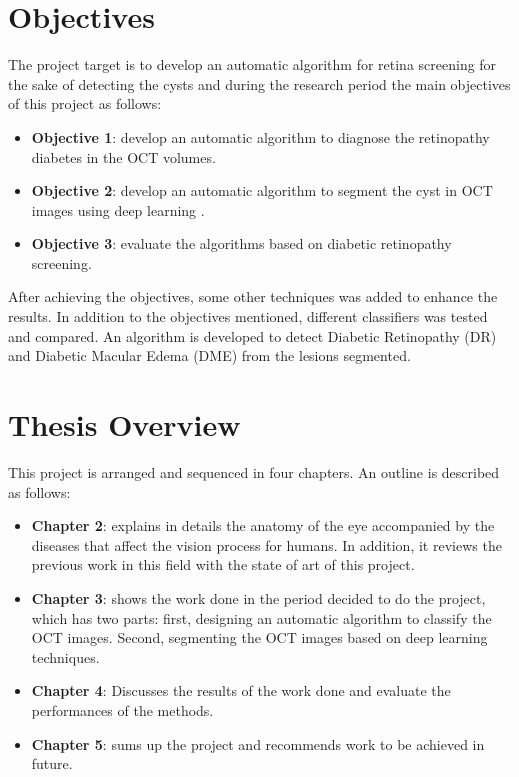 \section{Objectives} \label{sect:thefirst}
The project target is to develop an automatic algorithm for retina screening for the sake of detecting the cysts and during the research period the main objectives of this project as follows:

\begin{itemize}
\item \textbf{Objective 1}: develop an automatic algorithm to diagnose the retinopathy diabetes in the OCT volumes.

\item \textbf{Objective 2}: develop an automatic  algorithm to segment the cyst in OCT images using deep learning .

\item \textbf{Objective 3}: evaluate the algorithms based on diabetic retinopathy screening. 
\end{itemize}

After achieving the objectives, some other techniques was added to enhance the results.
In addition to the objectives mentioned, different classifiers was tested and compared.
An algorithm is developed to detect Diabetic Retinopathy (DR) and Diabetic Macular Edema (DME) from the lesions segmented.

\section{Thesis Overview}
This project is arranged and sequenced in four chapters. An outline is described as follows:

\begin{itemize}
\item \textbf{Chapter 2}: explains in details the anatomy of the eye accompanied by the diseases that affect the vision process for humans.
In addition, it reviews the previous work in this field with the state of art of this project.

\item \textbf{Chapter 3}: shows the work done in the period decided to do the project, which has two parts: first, designing an automatic algorithm to classify the OCT images.
Second, segmenting the OCT images based on deep learning techniques.

\item \textbf{Chapter 4}: Discusses the results of the work done and evaluate the performances of the methods.

\item \textbf{Chapter 5}: sums up the project and recommends work to be achieved in future.  
\end{itemize}

